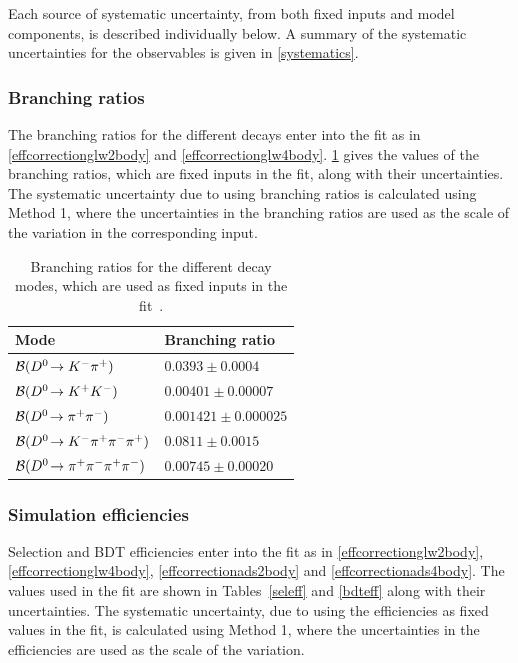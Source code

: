 Each source of systematic uncertainty, from both fixed inputs and model components, is described individually below. A summary of the systematic uncertainties for the \CP observables is given in \tab\ref{systematics}.

\subsubsection{Branching ratios}

The branching ratios for the different \Dz decays enter into the \CP fit as in \eqns\ref{effcorrectionglw2body} and \ref{effcorrectionglw4body}. \Tab\ref{BR} gives the values of the branching ratios, which are fixed inputs in the \CP fit, along with their uncertainties. The systematic uncertainty due to using branching ratios is calculated using Method 1, where the uncertainties in the branching ratios are used as the scale of the variation in the corresponding input.

\begin{table}
\centering
\begin{tabular}{l|l}
\hline
Mode & Branching ratio \\
\hline
$\mathcal{B}({{D}^0}\!\rightarrow {\ensuremath{{K}^-}}{\ensuremath{{\pi}^+}})$ & $0.0393 \pm 0.0004$ \\
$\mathcal{B}({{D}^0}\!\rightarrow {\ensuremath{{K}^+}}{\ensuremath{{K}^-}})$ & $0.00401 \pm 0.00007$ \\
$\mathcal{B}({{D}^0}\!\rightarrow {\ensuremath{{\pi}^+}}{\ensuremath{{\pi}^-}})$ & $0.001421 \pm 0.000025$ \\
$\mathcal{B}({{D}^0}\!\rightarrow {\ensuremath{{K}^-}}{\ensuremath{{\pi}^+}}{\ensuremath{{\pi}^-}}{\ensuremath{{\pi}^+}})$ & $0.0811 \pm 0.0015$ \\
$\mathcal{B}({{D}^0}\!\rightarrow {\ensuremath{{\pi}^+}}{\ensuremath{{\pi}^-}}{\ensuremath{{\pi}^+}}{\ensuremath{{\pi}^-}})$ & $0.00745 \pm 0.00020$ \\
\hline
\end{tabular}
\caption{Branching ratios for the different \Dz decay modes, which are used as fixed inputs in the \CP fit~\cite{PDG2014}.}
\label{BR}
\end{table}

\subsubsection{Simulation efficiencies}

Selection and BDT efficiencies enter into the \CP fit as in \eqns\ref{effcorrectionglw2body}, \ref{effcorrectionglw4body}, \ref{effcorrectionads2body} and \ref{effcorrectionads4body}. The values used in the \CP fit are shown in Tables~\ref{seleff} and \ref{bdteff} along with their uncertainties. The systematic uncertainty, due to using the efficiencies as fixed values in the \CP fit, is calculated using Method 1, where the uncertainties in the efficiencies are used as the scale of the variation.

